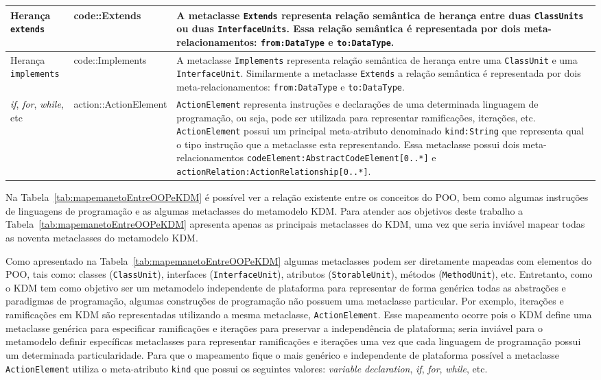 \begin{longtable}[c]{| m{1.9cm} | m{3.57cm}| m{9.3cm} |}
\hline
Herança \texttt{extends} & code::Extends & A metaclasse \texttt{Extends} representa relação semântica de herança entre duas \texttt{ClassUnits} ou duas \texttt{InterfaceUnits}. Essa relação semântica é representada por dois meta-relacionamentos: \texttt{from:DataType} e \texttt{to:DataType}.\\ 
\hline
Herança \texttt{implements} & code::Implements & A metaclasse \texttt{Implements} representa relação semântica de herança entre uma \texttt{ClassUnit} e uma \texttt{InterfaceUnit}. Similarmente a metaclasse \texttt{Extends} a relação semântica é representada por dois meta-relacionamentos: \texttt{from:DataType} e \texttt{to:DataType}.\\ 
\hline
\textit{if}, \textit{for}, \textit{while}, etc & action::ActionElement & \texttt{ActionElement} representa instruções e declarações de uma determinada linguagem de programação, ou seja, pode ser utilizada para representar ramificações, iterações, etc. \texttt{ActionElement} possui um principal meta-atributo denominado \texttt{kind:String} que representa qual o tipo instrução que a metaclasse esta representando. Essa metaclasse possui dois meta-relacionamentos \texttt{codeElement:AbstractCodeElement[0..*]} e \texttt{actionRelation:ActionRelationship[0..*]}.\\ 
\hline
 \end{longtable}

Na Tabela~\ref{tab:mapemanetoEntreOOPeKDM} é possível ver a relação existente entre os conceitos do POO, bem como algumas instruções de linguagens de programação e as algumas metaclasses do metamodelo KDM. Para atender aos objetivos deste trabalho a Tabela~\ref{tab:mapemanetoEntreOOPeKDM} apresenta apenas as principais metaclasses do KDM, uma vez que seria inviável mapear todas as noventa metaclasses do metamodelo KDM.

Como apresentado na Tabela~\ref{tab:mapemanetoEntreOOPeKDM} algumas metaclasses podem ser diretamente mapeadas com elementos do POO, tais como: classes (\texttt{ClassUnit}), interfaces (\texttt{InterfaceUnit}), atributos (\texttt{StorableUnit}), métodos (\texttt{MethodUnit}), etc. Entretanto, como o KDM tem como objetivo ser um metamodelo independente de plataforma para representar de forma genérica todas as abstrações e paradigmas de programação, algumas construções de programação não possuem uma metaclasse particular. Por exemplo, iterações e ramificações em KDM são representadas utilizando a mesma metaclasse, \texttt{ActionElement}. Esse mapeamento ocorre pois o KDM define uma metaclasse genérica para especificar ramificações e iterações para preservar a independência de plataforma; seria inviável para o metamodelo definir específicas metaclasses para representar ramificações e iterações uma vez que cada linguagem de programação possui um determinada particularidade. Para que o mapeamento fique o mais genérico e independente de plataforma possível a metaclasse \texttt{ActionElement} utiliza o meta-atributo \texttt{kind} que possui os seguintes valores: \textit{variable declaration}, \textit{if}, \textit{for}, \textit{while}, etc.

